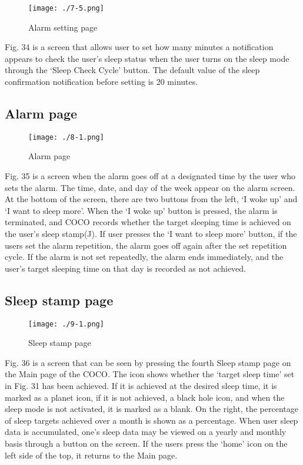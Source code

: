 \documentclass[conference]{IEEEtran}
\begin{document}
\begin{figure}[H]
\texttt{[image: ./7-5.png]}
\centering
\caption{Alarm setting page}
\end{figure}

Fig. 34 is a screen that allows user to set how many minutes a notification appears to check the user's sleep status when the user turns on the sleep mode through the ‘Sleep Check Cycle’ button. The default value of the sleep confirmation notification before setting is 20 minutes.

\subsection{Alarm page}
\begin{figure}[H]
\texttt{[image: ./8-1.png]}
\centering
\caption{Alarm page}
\end{figure}

Fig. 35 is a screen when the alarm goes off at a designated time by the user who sets the alarm. The time, date, and day of the week appear on the alarm screen. At the bottom of the screen, there are two buttons from the left, ‘I woke up’ and ‘I want to sleep more’. When the ‘I woke up’ button is pressed, the alarm is terminated, and COCO records whether the target sleeping time is achieved on the user's sleep stamp(J). If user presses the ‘I want to sleep more’ button, if the users set the alarm repetition, the alarm goes off again after the set repetition cycle. If the alarm is not set repeatedly, the alarm ends immediately, and the user's target sleeping time on that day is recorded as not achieved.

\subsection{Sleep stamp page}
\begin{figure}[H]
\texttt{[image: ./9-1.png]}
\centering
\caption{Sleep stamp page}
\end{figure}

Fig. 36 is a screen that can be seen by pressing the fourth Sleep stamp page on the Main page of the COCO. The icon shows whether the ‘target sleep time’ set in Fig. 31 has been achieved. If it is achieved at the desired sleep time, it is marked as a planet icon, if it is not achieved, a black hole icon, and when the sleep mode is not activated, it is marked as a blank. On the right, the percentage of sleep targets achieved over a month is shown as a percentage. When user sleep data is accumulated, one's sleep data may be viewed on a yearly and monthly basis through a button on the screen. If the users press the ‘home’ icon on the left side of the top, it returns to the Main page.
\end{document}

